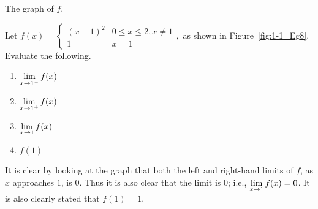 \begin{marginfigure}[8cm]
\caption{The graph of $f$.}\label{fig:1-1_Eg8}
\end{marginfigure}

\begin{example} \label{Ex:1.1.Eg8}
Let $f(x) = \left\{\begin{array}{cc} (x-1)^2 & 0\leq x\leq 2, x\neq 1\\ 1 & x=1\end{array},\right.$ as shown in Figure~\ref{fig:1-1_Eg8}. Evaluate the following.
\begin{multicols}{2}
\begin{enumerate}[1)]
\item $\displaystyle \lim_{x\to 1^-} f(x)$
\item $\displaystyle \lim_{x\to 1^+} f(x)$
\item $\displaystyle \lim_{x\to 1} f(x)$
\item $f(1)$
\end{enumerate}
\end{multicols}

\solution It is clear by looking at the graph that both the left and right-hand limits of $f$, as $x$ approaches $1$, is $0$. Thus it is also clear that the limit is $0$; i.e., $\displaystyle \lim_{x\to 1} f(x) = 0$. It is also clearly stated that $f(1) = 1$.
\end{example}